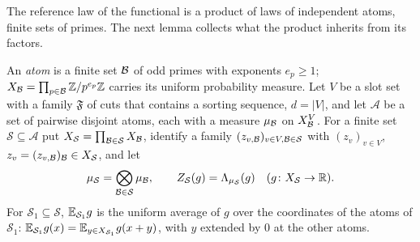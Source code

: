 The reference law of the functional is a product of laws of independent
atoms, finite sets of primes. The next lemma collects what the product
inherits from its factors.

An \emph{atom} is a finite set $\mathcal B$ of odd primes with exponents $e_p\ge1$;
$X_\mathcal B=\prod_{p\in\mathcal B}\mathbb Z/p^{e_p}\mathbb Z$ carries its uniform probability measure. Let
$V$ be a slot set with a family $\mathfrak F$ of cuts that contains a sorting
sequence, $d=|V|$, and let $\mathcal A$ be a set of pairwise disjoint atoms,
each with a measure $\mu_\mathcal B$ on $X_\mathcal B^V$. For a finite set
$\mathcal S\subseteq\mathcal A$ put $X_{\mathcal S}=\prod_{\mathcal B\in\mathcal S}X_\mathcal B$,
identify a family $(z_{v,\mathcal B})_{v\in V,\mathcal B\in\mathcal S}$ with $(z_v)_{v\in V}$,
$z_v=(z_{v,\mathcal B})_\mathcal B\in X_{\mathcal S}$, and let
\[
 \mu_{\mathcal S}=\bigotimes_{\mathcal B\in\mathcal S}\mu_\mathcal B ,\qquad
 Z_{\mathcal S}(g)=\Lambda_{\mu_{\mathcal S}}(g)\quad(g\colon X_{\mathcal S}\to\mathbb R).
\]
For $\mathcal S_1\subseteq\mathcal S$, $\mathbb E_{\mathcal S_1}g$ is the uniform average
of $g$ over the coordinates of the atoms of $\mathcal S_1$:
$\mathbb E_{\mathcal S_1}g(x)=\mathbb E_{y\in X_{\mathcal S_1}}g(x+y)$, with $y$ extended by $0$
at the other atoms.

